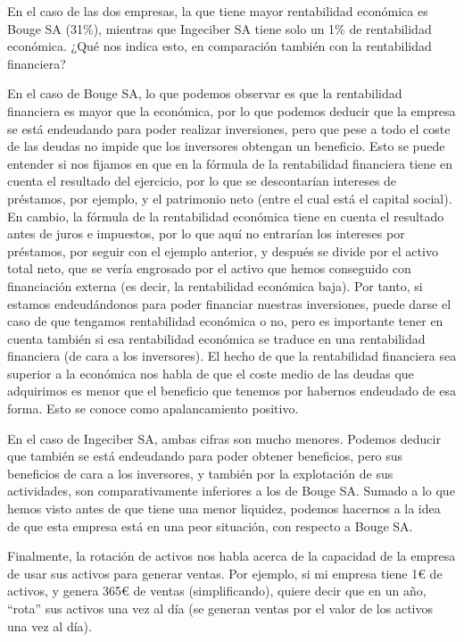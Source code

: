 \documentclass[a4paper]{article}
\begin{document}
En el caso de las dos empresas, la que tiene mayor rentabilidad económica es Bouge SA (31\%), mientras que Ingeciber SA tiene solo un 1\% de rentabilidad económica. ¿Qué nos indica esto, en comparación también con la rentabilidad financiera?

En el caso de Bouge SA, lo que podemos observar es que la rentabilidad financiera es mayor que la económica, por lo que podemos deducir que la empresa se está endeudando para poder realizar inversiones, pero que pese a todo el coste de las deudas no impide que los inversores obtengan un beneficio. Esto se puede entender si nos fijamos en que en la fórmula de la rentabilidad financiera tiene en cuenta el resultado del ejercicio, por lo que se descontarían intereses de préstamos, por ejemplo, y el patrimonio neto (entre el cual está el capital social). En cambio, la fórmula de la rentabilidad económica tiene en cuenta el resultado antes de juros e impuestos, por lo que aquí no entrarían los intereses por préstamos, por seguir con el ejemplo anterior, y después se divide por el activo total neto, que se vería engrosado por el activo que hemos conseguido con financiación externa (es decir, la rentabilidad económica baja). Por tanto, si estamos endeudándonos para poder financiar nuestras inversiones, puede darse el caso de que tengamos rentabilidad económica o no, pero es importante tener en cuenta también si esa rentabilidad económica se traduce en una rentabilidad financiera (de cara a los inversores). El hecho de que la rentabilidad financiera sea superior a la económica nos habla de que el coste medio de las deudas que adquirimos es menor que el beneficio que tenemos por habernos endeudado de esa forma. Esto se conoce como apalancamiento positivo.

En el caso de Ingeciber SA, ambas cifras son mucho menores. Podemos deducir que también se está endeudando para poder obtener beneficios, pero sus beneficios de cara a los inversores, y también por la explotación de sus actividades, son comparativamente inferiores a los de Bouge SA. Sumado a lo que hemos visto antes de que tiene una menor liquidez, podemos hacernos a la idea de que esta empresa está en una peor situación, con respecto a Bouge SA.

Finalmente, la rotación de activos nos habla acerca de la capacidad de la empresa de usar sus activos para generar ventas. Por ejemplo, si mi empresa tiene 1€ de activos, y genera 365€ de ventas (simplificando), quiere decir que en un año, ``rota'' sus activos una vez al día (se generan ventas por el valor de los activos una vez al día).
\end{document}
